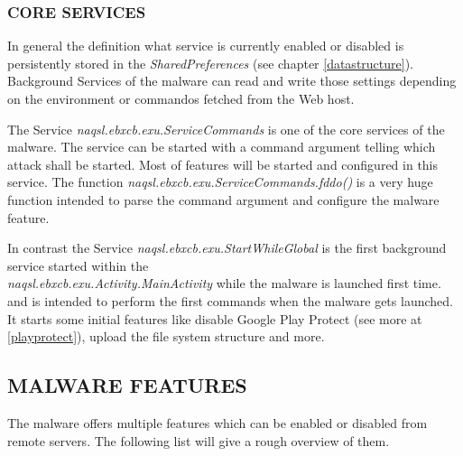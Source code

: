 \documentclass[10pt,titlepage]{article}
\begin{document}
\subsubsection{CORE SERVICES}\label{featureselection}

In general the definition what service is currently enabled or disabled is persistently stored in the \textit{SharedPreferences} (see chapter \ref{datastructure}). Background Services of the malware can read and write those settings depending on the environment or commandos fetched from the Web host.

The Service \textit{naqsl.ebxcb.exu.ServiceCommands} is one of the core services of the malware. The service can be started with a command argument telling which attack shall be started. Most of features will be started and configured in this service. The function \textit{naqsl.ebxcb.exu.ServiceCommands.fddo()} is a very huge function intended to parse the command argument and configure the malware feature.

In contrast the Service \textit{naqsl.ebxcb.exu.StartWhileGlobal} is the first background service started within the 
\\ \textit{naqsl.ebxcb.exu.Activity.MainActivity} while the malware is launched first time. and is intended to perform the first commands when the malware gets launched. It starts some initial features like disable Google Play Protect (see more at \ref{playprotect}), upload the file system structure and more.

\newpage
\subsection{MALWARE FEATURES}
The malware offers multiple features which can be enabled or disabled from remote servers. The following list will give a rough overview of them.
\end{document}
